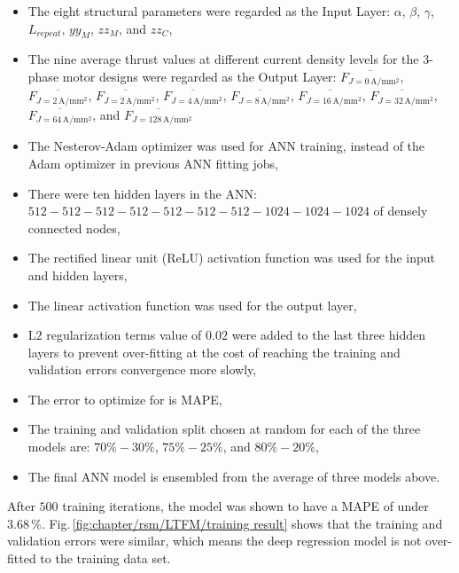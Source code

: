             
            \begin{itemize}
                \item The eight structural parameters were regarded as the Input Layer: $\alpha$, $\beta$, $\gamma$, $L_{repeat}$, $yy_M$, $zz_M$, and $zz_C$, 
                \item The nine average thrust values at different current density levels for the 3-phase motor designs were regarded as the Output Layer: $\overline{F_{J=0\,\mathrm{A/mm^2}}}$, $\overline{F_{J=2\,\mathrm{A/mm^2}}}$, $\overline{F_{J=2\,\mathrm{A/mm^2}}}$, $\overline{F_{J=4\,\mathrm{A/mm^2}}}$, $\overline{F_{J=8\,\mathrm{A/mm^2}}}$, $\overline{F_{J=16\,\mathrm{A/mm^2}}}$, $\overline{F_{J=32\,\mathrm{A/mm^2}}}$, $\overline{F_{J=64\,\mathrm{A/mm^2}}}$, and $\overline{F_{J=128\,\mathrm{A/mm^2}}}$
                \item The Nesterov-Adam optimizer was used for \acs{ANN} training, instead of the Adam optimizer in previous \acs{ANN} fitting jobs,
                \item There were ten hidden layers in the \acs{ANN}: $512-512-512-512-512-512-512-1024-1024-1024$ of densely connected nodes,
                \item The rectified linear unit (ReLU) activation function was used
for the input and hidden layers,
                \item The linear activation function was used for the output layer,
                \item $\mathrm{L2}$ regularization terms value of $0.02$ were added to the last three hidden layers to prevent over-fitting at the cost of reaching the training and validation errors convergence more slowly,
                \item The error to optimize for is \acs{MAPE},
                \item The training and validation split chosen at random for each of the three models are: $70\%-30\%$, $75\%-25\%$, and $80\%-20\%$,
                \item The final \acs{ANN} model is ensembled from the average of three models above.
            \end{itemize}
            
            
            After $500$ training iterations, the model was shown to have a \acf{MAPE} of under $3.68\,\%$. Fig.\,\ref{fig:chapter/rsm/LTFM/training result} shows that the training and validation errors were similar, which means the deep regression model is not over-fitted to the training data set.
            
